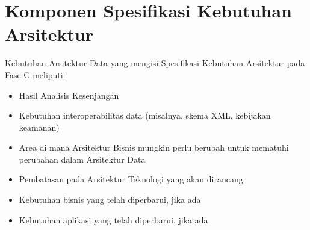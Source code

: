 \section{Komponen Spesifikasi Kebutuhan Arsitektur}
\label{sec:spesifikasi_kebutuhan_arsitektur_data}
Kebutuhan Arsitektur Data yang mengisi Spesifikasi Kebutuhan Arsitektur pada Fase C meliputi:
\begin{itemize}
	\item Hasil Analisis Kesenjangan
	\item Kebutuhan interoperabilitas data (misalnya, skema XML, kebijakan keamanan)
	\item Area di mana Arsitektur Bisnis mungkin perlu berubah untuk mematuhi perubahan dalam Arsitektur Data
	\item Pembatasan pada Arsitektur Teknologi yang akan dirancang
	\item Kebutuhan bisnis yang telah diperbarui, jika ada
	\item Kebutuhan aplikasi yang telah diperbarui, jika ada
\end{itemize}

